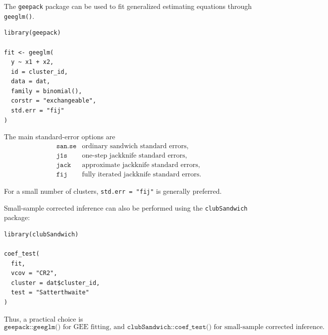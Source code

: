 \documentclass[11pt]{article}
\theoremstyle{definition}
\begin{document}
The \texttt{geepack} package can be used to fit generalized estimating
equations through \texttt{geeglm()}.

\begin{verbatim}
library(geepack)

fit <- geeglm(
  y ~ x1 + x2,
  id = cluster_id,
  data = dat,
  family = binomial(),
  corstr = "exchangeable",
  std.err = "fij"
)
\end{verbatim}

The main standard-error options are
\[
\begin{array}{ll}
\texttt{san.se} & \text{ordinary sandwich standard errors},\\
\texttt{j1s}    & \text{one-step jackknife standard errors},\\
\texttt{jack}   & \text{approximate jackknife standard errors},\\
\texttt{fij}    & \text{fully iterated jackknife standard errors}.
\end{array}
\]

For a small number of clusters, \texttt{std.err = "fij"} is generally
preferred.

Small-sample corrected inference can also be performed using the
\texttt{clubSandwich} package:

\begin{verbatim}
library(clubSandwich)

coef_test(
  fit,
  vcov = "CR2",
  cluster = dat$cluster_id,
  test = "Satterthwaite"
)
\end{verbatim}

Thus, a practical choice is
\[
\boxed{
\texttt{geepack::geeglm()}
\text{ for GEE fitting, and }
\texttt{clubSandwich::coef\_test()}
\text{ for small-sample corrected inference.}
}
\]
\end{document}
